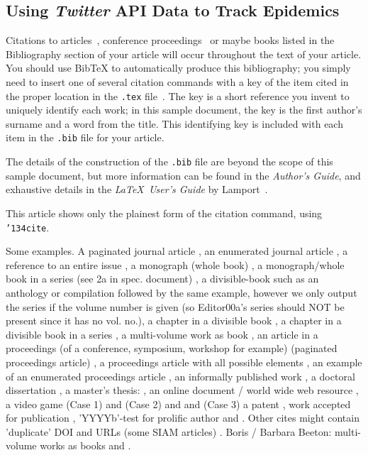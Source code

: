 \documentclass[sigconf]{acmart}
\begin{document}
\subsection{Using {\itshape Twitter} API Data to Track Epidemics}

Citations to articles~\cite{bowman:reasoning, clark:pct, braams:babel,
  herlihy:methodology}, conference proceedings~\cite{clark:pct} or
maybe books \cite{Lamport:LaTeX, salas:calculus} listed in the
Bibliography section of your article will occur throughout the text of
your article.  You should use BibTeX to automatically produce this
bibliography; you simply need to insert one of several citation
commands with a key of the item cited in the proper location in the
\texttt{.tex} file~\cite{Lamport:LaTeX}.  The key is a short reference
you invent to uniquely identify each work; in this sample document,
the key is the first author's surname and a word from the title.  This
identifying key is included with each item in the \texttt{.bib} file
for your article.

The details of the construction of the \texttt{.bib} file are beyond
the scope of this sample document, but more information can be found
in the \textit{Author's Guide}, and exhaustive details in the
\textit{\LaTeX\ User's Guide} by Lamport~.

This article shows only the plainest form of the citation command,
using \texttt{{\char'134}cite}.

Some examples.  A paginated journal article \cite{Abril07}, an
enumerated journal article \cite{Cohen07}, a reference to an entire
issue \cite{JCohen96}, a monograph (whole book) \cite{Kosiur01}, a
monograph/whole book in a series (see 2a in spec. document)
\cite{Harel79}, a divisible-book such as an anthology or compilation
\cite{Editor00} followed by the same example, however we only output
the series if the volume number is given \cite{Editor00a} (so
Editor00a's series should NOT be present since it has no vol. no.), a
chapter in a divisible book \cite{Spector90}, a chapter in a divisible
book in a series \cite{Douglass98}, a multi-volume work as book
\cite{Knuth97}, an article in a proceedings (of a conference,
symposium, workshop for example) (paginated proceedings article)
\cite{Andler79}, a proceedings article with all possible elements
\cite{Smith10}, an example of an enumerated proceedings article
\cite{VanGundy07}, an informally published work \cite{Harel78}, a
doctoral dissertation \cite{Clarkson85}, a master's thesis:
\cite{anisi03}, an online document / world wide web resource
\cite{Thornburg01, Ablamowicz07, Poker06}, a video game (Case 1)
\cite{Obama08} and (Case 2) \cite{Novak03} and \cite{Lee05} and (Case
3) a patent \cite{JoeScientist001}, work accepted for publication
\cite{rous08}, 'YYYYb'-test for prolific author \cite{SaeediMEJ10} and
\cite{SaeediJETC10}. Other cites might contain 'duplicate' DOI and
URLs (some SIAM articles) \cite{Kirschmer:2010:AEI:1958016.1958018}.
Boris / Barbara Beeton: multi-volume works as books \cite{MR781536}
and \cite{MR781537}.
\end{document}
